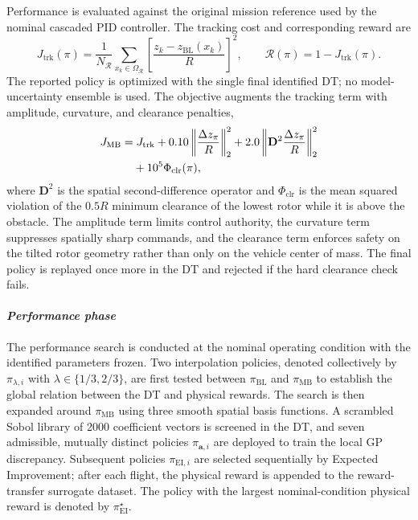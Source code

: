 \documentclass[journal]{IEEEtran}
\begin{document}
Performance is evaluated against the original mission reference used by the nominal cascaded PID controller. The tracking cost and corresponding reward are
\begin{equation}
 J_{\mathrm{trk}}(\pi)=\frac{1}{N_{\mathcal R}}
 \sum_{x_k\in\Omega_{\mathcal R}}
 \left[\frac{z_k-z_{\mathrm{BL}}(x_k)}{R}\right]^2,
 \qquad
 \mathcal{R}(\pi)=1-J_{\mathrm{trk}}(\pi).
 \label{eq:reward}
\end{equation}
The reported policy is optimized with the single final identified DT; no model-uncertainty ensemble is used. The objective augments the tracking term with amplitude, curvature, and clearance penalties,
\begin{align}
 J_{\mathrm{MB}}=&\;J_{\mathrm{trk}}
 +0.10\left\|\frac{\Delta z_{\pi}}{R}\right\|_2^2
 +2.0\left\|\mathbf{D}^2\frac{\Delta z_{\pi}}{R}\right\|_2^2 \notag\\
 &+10^5\Phi_{\mathrm{clr}}(\pi),
 \label{eq:mb-objective}
\end{align}
where $\mathbf{D}^2$ is the spatial second-difference operator and $\Phi_{\mathrm{clr}}$ is the mean squared violation of the $0.5R$ minimum clearance of the lowest rotor while it is above the obstacle. The amplitude term limits control authority, the curvature term suppresses spatially sharp commands, and the clearance term enforces safety on the tilted rotor geometry rather than only on the vehicle center of mass. The final policy is replayed once more in the DT and rejected if the hard clearance check fails.

\paragraph*{\textit{Performance phase}}
\label{sec:performance-phase}
The performance search is conducted at the nominal operating condition with the identified parameters frozen. Two interpolation policies, denoted collectively by $\pi_{\lambda,i}$ with $\lambda\in\{1/3,2/3\}$, are first tested between $\pi_{\mathrm{BL}}$ and $\pi_{\mathrm{MB}}$ to establish the global relation between the DT and physical rewards. The search is then expanded around $\pi_{\mathrm{MB}}$ using three smooth spatial basis functions. A scrambled Sobol library of 2000 coefficient vectors is screened in the DT, and seven admissible, mutually distinct policies $\pi_{\mathbf a,i}$ are deployed to train the local GP discrepancy. Subsequent policies $\pi_{\mathrm{EI},i}$ are selected sequentially by Expected Improvement; after each flight, the physical reward is appended to the reward-transfer surrogate dataset. The policy with the largest nominal-condition physical reward is denoted by $\pi_{\mathrm{EI}}^{\star}$.
\end{document}
